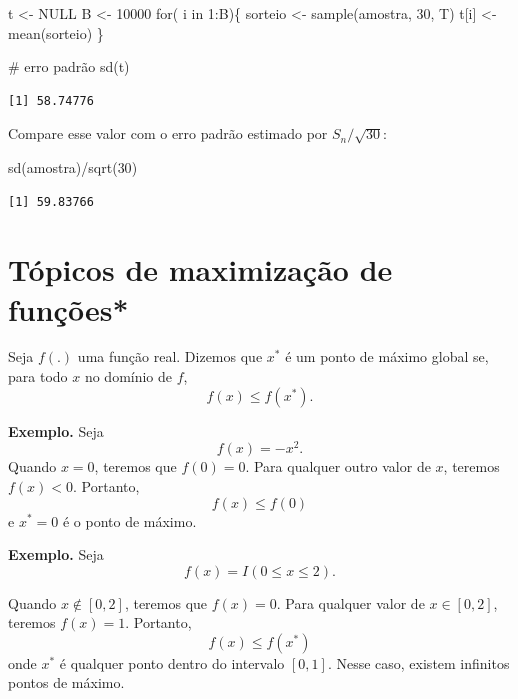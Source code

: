\documentclass[
  letterpaper,
  DIV=11,
  numbers=noendperiod]{scrartcl}
\newenvironment{Shaded}{\begin{snugshade}}{\end{snugshade}}
\newcommand{\CommentTok}[1]{\textcolor[rgb]{0.37,0.37,0.37}{#1}}
\newcommand{\ConstantTok}[1]{\textcolor[rgb]{0.56,0.35,0.01}{#1}}
\newcommand{\ControlFlowTok}[1]{\textcolor[rgb]{0.00,0.23,0.31}{#1}}
\newcommand{\DecValTok}[1]{\textcolor[rgb]{0.68,0.00,0.00}{#1}}
\newcommand{\FunctionTok}[1]{\textcolor[rgb]{0.28,0.35,0.67}{#1}}
\newcommand{\NormalTok}[1]{\textcolor[rgb]{0.00,0.23,0.31}{#1}}
\newcommand{\OtherTok}[1]{\textcolor[rgb]{0.00,0.23,0.31}{#1}}
\newcommand{\SpecialCharTok}[1]{\textcolor[rgb]{0.37,0.37,0.37}{#1}}
\begin{document}
\begin{Shaded}
\begin{Highlighting}[]
\NormalTok{t }\OtherTok{\textless{}{-}} \ConstantTok{NULL}
\NormalTok{B }\OtherTok{\textless{}{-}} \DecValTok{10000}
\ControlFlowTok{for}\NormalTok{( i }\ControlFlowTok{in} \DecValTok{1}\SpecialCharTok{:}\NormalTok{B)\{ }
\NormalTok{sorteio }\OtherTok{\textless{}{-}} \FunctionTok{sample}\NormalTok{(amostra, }\DecValTok{30}\NormalTok{, T)}
\NormalTok{t[i] }\OtherTok{\textless{}{-}} \FunctionTok{mean}\NormalTok{(sorteio)}
\NormalTok{\}}

\CommentTok{\# erro padrão}
\FunctionTok{sd}\NormalTok{(t)}
\end{Highlighting}
\end{Shaded}

\begin{verbatim}
[1] 58.74776
\end{verbatim}

Compare esse valor com o erro padrão estimado por \(S_n/\sqrt{30}\):

\begin{Shaded}
\begin{Highlighting}[]
\FunctionTok{sd}\NormalTok{(amostra)}\SpecialCharTok{/}\FunctionTok{sqrt}\NormalTok{(}\DecValTok{30}\NormalTok{)}
\end{Highlighting}
\end{Shaded}

\begin{verbatim}
[1] 59.83766
\end{verbatim}

\section{Tópicos de maximização de
funções*}\label{tuxf3picos-de-maximizauxe7uxe3o-de-funuxe7uxf5es}

Seja \(f(.)\) uma função real. Dizemos que \(x^*\) é um ponto de máximo
global se, para todo \(x\) no domínio de \(f\), \[f(x)\leq f(x^*).\]

\textbf{Exemplo.} Seja \[f(x)= -x^2.\] Quando \(x=0\), teremos que
\(f(0)=0\). Para qualquer outro valor de \(x\), teremos \(f(x)<0\).
Portanto, \[f(x)\leq f(0)\] e \(x^*=0\) é o ponto de máximo.

\textbf{Exemplo.} Seja \[f(x)= I(0\leq x \leq 2).\]

Quando \(x\notin[0,2]\), teremos que \(f(x)=0\). Para qualquer valor de
\(x\in[0,2]\), teremos \(f(x)=1\). Portanto, \[f(x)\leq f(x^*)\] onde
\(x^*\) é qualquer ponto dentro do intervalo \([0,1]\). Nesse caso,
existem infinitos pontos de máximo.
\end{document}
